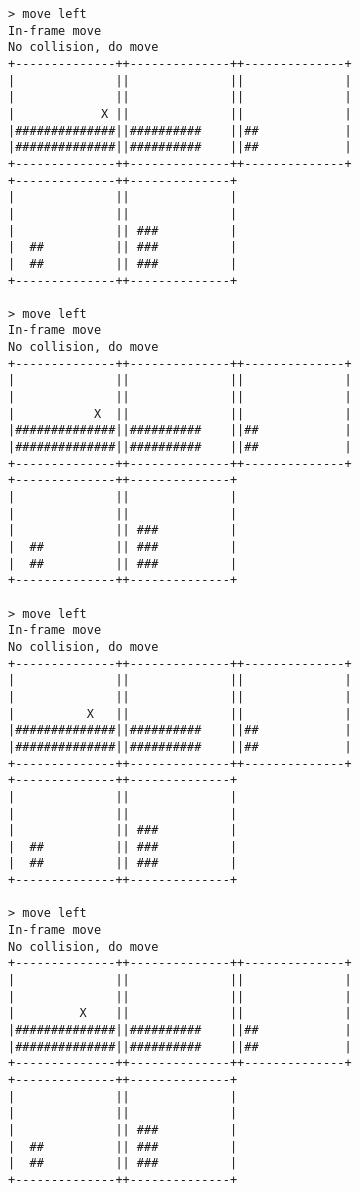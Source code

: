 \begin{verbatim}
> move left
In-frame move
No collision, do move
+--------------++--------------++--------------+
|              ||              ||              |
|              ||              ||              |
|            X ||              ||              |
|##############||##########    ||##            |
|##############||##########    ||##            |
+--------------++--------------++--------------+
+--------------++--------------+                
|              ||              |                
|              ||              |                
|              || ###          |                
|  ##          || ###          |                
|  ##          || ###          |                
+--------------++--------------+                

> move left
In-frame move
No collision, do move
+--------------++--------------++--------------+
|              ||              ||              |
|              ||              ||              |
|           X  ||              ||              |
|##############||##########    ||##            |
|##############||##########    ||##            |
+--------------++--------------++--------------+
+--------------++--------------+                
|              ||              |                
|              ||              |                
|              || ###          |                
|  ##          || ###          |                
|  ##          || ###          |                
+--------------++--------------+                

> move left
In-frame move
No collision, do move
+--------------++--------------++--------------+
|              ||              ||              |
|              ||              ||              |
|          X   ||              ||              |
|##############||##########    ||##            |
|##############||##########    ||##            |
+--------------++--------------++--------------+
+--------------++--------------+                
|              ||              |                
|              ||              |                
|              || ###          |                
|  ##          || ###          |                
|  ##          || ###          |                
+--------------++--------------+                

> move left
In-frame move
No collision, do move
+--------------++--------------++--------------+
|              ||              ||              |
|              ||              ||              |
|         X    ||              ||              |
|##############||##########    ||##            |
|##############||##########    ||##            |
+--------------++--------------++--------------+
+--------------++--------------+                
|              ||              |                
|              ||              |                
|              || ###          |                
|  ##          || ###          |                
|  ##          || ###          |                
+--------------++--------------+                


\end{verbatim}
